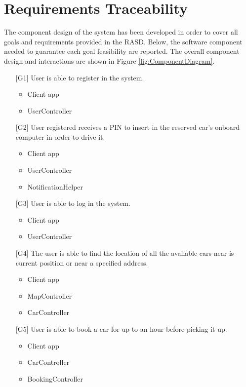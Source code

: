 \chapter{Requirements Traceability}
The component design of the system has been developed in order to cover all goals and requirements provided in the RASD. Below, the software component needed to guarantee each goal feasibility are reported.
The overall component design and interactions are shown in Figure \ref{fig:ComponentDiagram}.

\begin{itemize}
	\item[{[G1]}] User is able to register in the system.
		\begin{itemize}
			\item Client app
			\item UserController
		\end{itemize}
	\item[{[G2]}] User registered receives a PIN to insert in the reserved car's onboard computer in order to drive it.
		\begin{itemize}
			\item Client app
			\item UserController
			\item NotificationHelper
		\end{itemize}
	\item[{[G3]}] User is able to log in the system.
		\begin{itemize}
			\item Client app
			\item UserController
		\end{itemize}
	\item[{[G4]}] The user is able to find the location of all the available cars near is current position or near a specified address.
		\begin{itemize}
			\item Client app
			\item MapController
			\item CarController
		\end{itemize}
	\item[{[G5]}] User is able to book a car for up to an hour before picking it up.
		\begin{itemize}
			\item Client app
			\item CarController
			\item BookingController
		\end{itemize}

\end{itemize}
